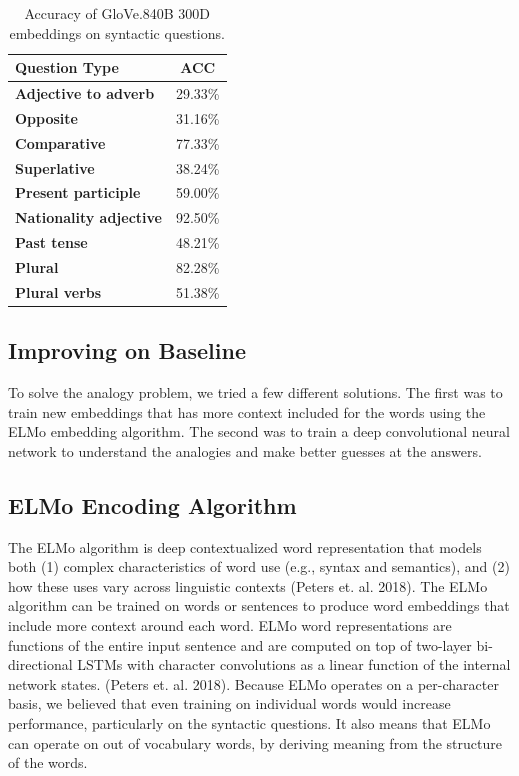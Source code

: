 \documentclass[11pt]{article}
\begin{document}
\begin{table}[h]
\begin{center}
\begin{tabular}{|l|c|}
\hline\bf Question Type & ACC \\\hline
\bf Adjective to adverb & 29.33\% \\
\bf Opposite & 31.16\% \\
\bf Comparative & 77.33\% \\
\bf Superlative & 38.24\% \\
\bf Present participle & 59.00\% \\
\bf Nationality adjective & 92.50\% \\
\bf Past tense & 48.21\% \\
\bf Plural & 82.28\% \\
\bf Plural verbs & 51.38\% \\\hline
\end{tabular}
\end{center}
\caption{\label{font-table} Accuracy of GloVe.840B 300D embeddings on syntactic questions.}
\end{table}

\subsection{Improving on Baseline}

To solve the analogy problem, we tried a few different solutions. The first was
to train new embeddings that has more context included for the words using the
ELMo embedding algorithm. The second was to train a deep convolutional neural
network to understand the analogies and make better guesses at the answers.

\subsection{ELMo Encoding Algorithm}

The ELMo algorithm is deep contextualized word representation that models both
(1) complex characteristics of word use (e.g., syntax and semantics), and (2)
how these uses vary across linguistic contexts (Peters et. al. 2018). The ELMo
algorithm can be trained on words or sentences to produce word embeddings that
include more context around each word. ELMo word representations are functions
of the entire input sentence and are computed on top of two-layer bi-directional
LSTMs with character convolutions as a linear function of the internal network
states. (Peters et. al. 2018). Because ELMo operates on a per-character basis,
we believed that even training on individual words would increase performance,
particularly on the syntactic questions. It also means that ELMo can operate on
out of vocabulary words, by deriving meaning from the structure of the words.
\end{document}
